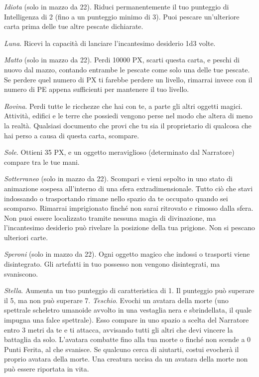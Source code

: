 \begin{multicols}{2}
	\textit{Idiota} (solo in mazzo da 22). Riduci permanentemente il tuo punteggio di Intelligenza di 2 (fino a un punteggio minimo di 3). Puoi pescare un'ulteriore carta prima delle tue altre pescate dichiarate.

	\textit{Luna}. Ricevi la capacità di lanciare l'incantesimo desiderio 1d3 volte.

	\textit{Matto} (solo in mazzo da 22). Perdi 10000 PX, scarti questa carta, e peschi di nuovo dal mazzo, contando entrambe le pescate come solo una delle tue pescate. Se perdere quel numero di PX ti farebbe perdere un livello, rimarrai invece con il numero di PE appena sufficienti per mantenere il tuo livello.

	\textit{Rovina}. Perdi tutte le ricchezze che hai con te, a parte gli altri oggetti magici. Attività, edifici e le terre che possiedi vengono perse nel modo che altera di meno la realtà. Qualsiasi documento che provi che tu sia il proprietario di qualcosa che hai perso a causa di questa carta, scompare.

	\textit{Sole}. Ottieni 35 PX, e un oggetto meraviglioso (determinato dal Narratore) compare tra le tue mani.

	\textit{Sotterraneo} (solo in mazzo da 22). Scompari e vieni sepolto in uno stato di animazione sospesa all'interno di una sfera extradimensionale. Tutto ciò che stavi indossando o trasportando rimane nello spazio da te occupato quando sei scomparso. Rimarrai imprigionato finché non sarai ritrovato e rimosso dalla sfera. Non puoi essere localizzato tramite nessuna magia di divinazione, ma l'incantesimo desiderio può rivelare la posizione della tua prigione. Non si pescano ulteriori carte.

	\textit{Speroni} (solo in mazzo da 22). Ogni oggetto magico che indossi o trasporti viene disintegrato. Gli artefatti in tuo possesso non vengono disintegrati, ma svaniscono.

	\textit{Stella}. Aumenta un tuo punteggio di caratteristica di 1. Il punteggio può superare il 5, ma non può superare 7.
	\textit{Teschio}. Evochi un avatara della morte (uno spettrale scheletro umanoide avvolto in una vestaglia nera e sbrindellata, il quale impugna una falce spettrale). Esso compare in uno spazio a scelta del Narratore entro 3 metri da te e ti attacca, avvisando tutti gli altri che devi vincere la battaglia da solo. L'avatara combatte fino alla tua morte o finché non scende a 0 Punti Ferita, al che svanisce. Se qualcuno cerca di aiutarti, costui evocherà il proprio avatara della morte. Una creatura uccisa da un avatara della morte non può essere riportata in vita.


\end{multicols}
